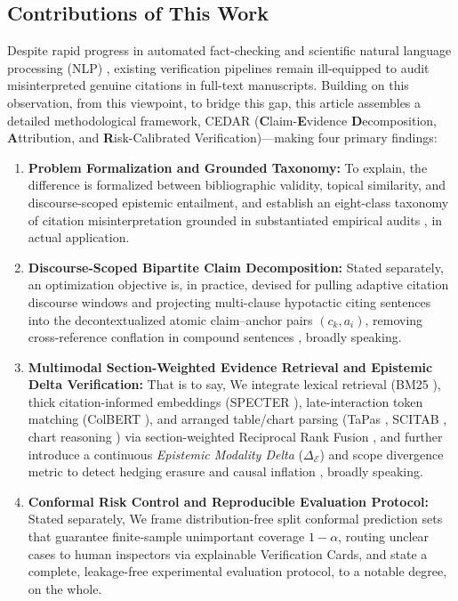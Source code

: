 \documentclass[sigconf]{acmart}
\begin{document}
\subsection{Contributions of This Work}
Despite rapid progress in automated fact-checking \cite{thorne2018fever,zeng2021automated} and scientific natural language processing (NLP) \cite{wadden2020fact,vladika2023scientific}, existing verification pipelines remain ill-equipped to audit misinterpreted genuine citations in full-text manuscripts. Building on this observation, from this viewpoint, to bridge this gap, this article assembles a detailed methodological framework, CEDAR (\textbf{C}laim-\textbf{E}vidence \textbf{D}ecomposition, \textbf{A}ttribution, and \textbf{R}isk-Calibrated Verification)---making four primary findings:
\begin{enumerate}
\item \textbf{Problem Formalization and Grounded Taxonomy:} To explain, the difference is formalized between bibliographic validity, topical similarity, and discourse-scoped epistemic entailment, and establish an eight-class taxonomy of citation misinterpretation grounded in substantiated empirical audits \cite{delacey1985accurate,greenberg2009citation,jergas2015quotation,mogull2017accuracy}, in actual application.
\item \textbf{Discourse-Scoped Bipartite Claim Decomposition:} Stated separately, an optimization objective is, in practice, devised for pulling adaptive citation discourse windows and projecting multi-clause hypotactic citing sentences into the decontextualized atomic claim--anchor pairs $(c_k, a_i)$, removing cross-reference conflation in compound sentences \cite{kamoi2023wice,min2023factscore}, broadly speaking.
\item \textbf{Multimodal Section-Weighted Evidence Retrieval and Epistemic Delta Verification:} That is to say, We integrate lexical retrieval (BM25 \cite{robertson2009probabilistic}), thick citation-informed embeddings (SPECTER \cite{cohan2020specter}), late-interaction token matching (ColBERT \cite{khattab2020colbert}), and arranged table/chart parsing (TaPas \cite{herzig2020tapas}, SCITAB \cite{lu2023scitab}, chart reasoning \cite{akhtar2023reading}) via section-weighted Reciprocal Rank Fusion \cite{cormack2009reciprocal}, and further introduce a continuous \emph{Epistemic Modality Delta} ($\Delta_{\mathcal{E}}$) and scope divergence metric to detect hedging erasure and causal inflation \cite{hyland1998hedging}, broadly speaking.
\item \textbf{Conformal Risk Control and Reproducible Evaluation Protocol:} Stated separately, We frame distribution-free split conformal prediction sets \cite{sadinle2019least,angelopoulos2023conformal} that guarantee finite-sample unimportant coverage $1-\alpha$, routing unclear cases to human inspectors via explainable Verification Cards, and state a complete, leakage-free experimental evaluation protocol, to a notable degree, on the whole.
\end{enumerate}
\end{document}
